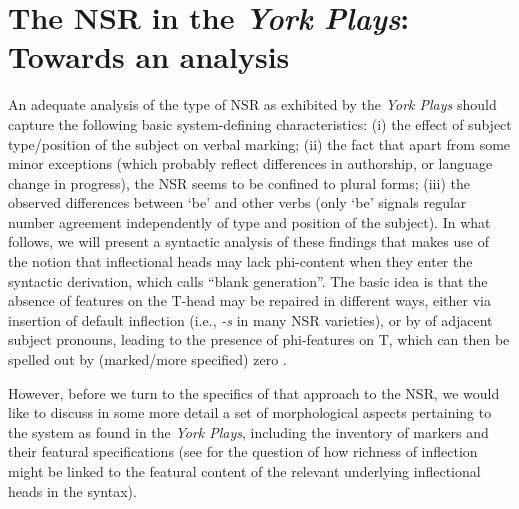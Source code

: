\documentclass[output=paper]{langsci/langscibook}
\begin{document}
\section{The NSR in the \emph{York Plays}: Towards an analysis}
\label{sec:towards-an-analysis}
An adequate analysis of the type of \gls{NSR} as
exhibited by the \emph{York Plays} should capture the following basic
system-defining characteristics: (i) the effect of subject type/position of the
subject on verbal  marking; (ii) the fact that apart from some minor
exceptions (which probably reflect differences in authorship, or language
change in progress), the \gls{NSR} seems to be
confined to plural forms; (iii) the observed differences between `be' and other
verbs (only `be' signals regular number agreement independently of type and position of the subject). In what follows,
we will present a syntactic analysis of these findings that makes use of the
notion that inflectional heads may lack phi-content when they enter the
syntactic derivation, which \textcite{Roberts:2010} calls ``blank generation''.
The basic idea is that the absence of  features on the T-head
may be repaired in different ways, either via insertion of default inflection
(i.e., \emph{-s} in many \gls{NSR} varieties), or by
 of adjacent subject pronouns, leading to the presence of
phi-features on T, which can then be spelled out by (marked/more
specified) zero .

However, before we turn to the specifics of that approach to the
\gls{NSR}, we would like to discuss in some more
detail a set of morphological aspects pertaining to the  system
as found in the \emph{York Plays}, including the inventory of markers and their
featural specifications (see  for the question of how richness
of inflection might be linked to the featural content of the relevant
underlying inflectional heads in the syntax).
\end{document}
